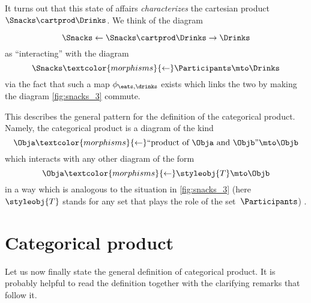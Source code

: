 \begin{figure*}[h!]
    \centering
    \caption{Choosing food and drink separately is essentially the same as choosing a combination of the two. }
    \label{fig:snacks_3}
\end{figure*}

It turns out that this state of affairs \emph{characterizes} the cartesian product $\Snacks\cartprod \Drinks$.
We think of the diagram

\begin{equation}
    \label{eq:snacks-prod-diagram}
    \Snacks \leftarrow \Snacks \cartprod \Drinks \rightarrow \Drinks
\end{equation}
as ``interacting'' with the diagram
\begin{equation}
    \label{eq:snacks-prod-test-diagram}
    \Snacks \textcolor{morphisms}{\leftarrow} \Participants \mto \Drinks
\end{equation}
via the fact that such a map $\phi_{\eats,\drinks}$ exists which links the two by making the diagram \cref{fig:snacks_3} commute.

This describes the general pattern for the definition of the categorical product.
Namely, the categorical product is a diagram of the kind
\begin{equation}
    \label{eq:prod-inline-generic-diagram}
    \Obja \textcolor{morphisms}{\leftarrow} \text{``product of } \Obja \text{ and } \Objb \text{''}  \mto \Objb
\end{equation}
which interacts with any other diagram of the form
\begin{equation}
    \label{eq:prod-inline-test-diagram}
    \Obja \textcolor{morphisms}{\leftarrow}\styleobj{T} \mto \Objb
\end{equation}
in a way which is analogous to the situation in \cref{fig:snacks_3} (here~$\styleobj{T}$ stands for any set that plays the role of the set~$\Participants$) .

\section{Categorical product}


Let us now finally state the general definition of categorical product.
It is probably helpful to read the definition together with the clarifying remarks that follow it.

